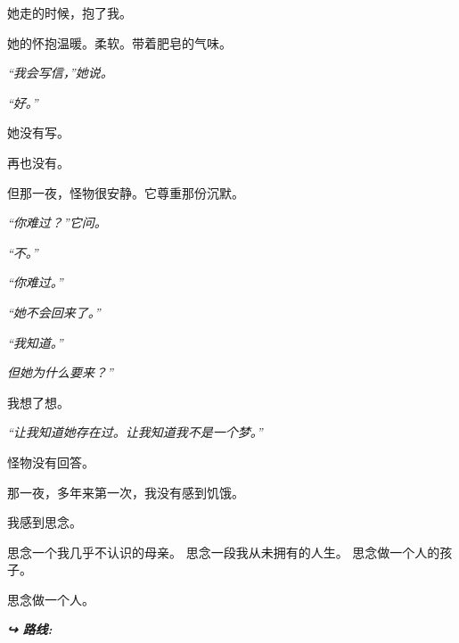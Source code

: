 \noindent 她走的时候，抱了我。

\noindent 她的怀抱温暖。柔软。带着肥皂的气味。

\noindent \textit{“我会写信，”她说。}

\noindent \textit{“好。”}

\noindent 她没有写。

\noindent 再也没有。

\noindent 但那一夜，怪物很安静。它尊重那份沉默。

\noindent \textit{“你难过？”它问。}

\noindent \textit{“不。”}

\noindent \textit{“你难过。”}

\noindent \textit{“她不会回来了。”}

\noindent \textit{“我知道。”}

\noindent \textit{但她为什么要来？”}

\noindent 我想了想。

\noindent \textit{“让我知道她存在过。让我知道我不是一个梦。”}

\noindent 怪物没有回答。

\noindent 那一夜，多年来第一次，我没有感到饥饿。

\noindent 我感到思念。

\noindent 思念一个我几乎不认识的母亲。
思念一段我从未拥有的人生。
思念做一个人的孩子。

\noindent 思念做一个人。

\vspace{0.5em}
\noindent\textit{\textbf{↪ 路线:}  \rotasep {}}
